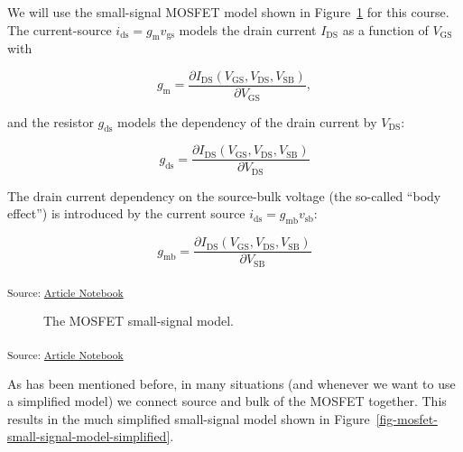 \documentclass[
  a4paper,
  DIV=11,
  numbers=noendperiod]{scrartcl}
\begin{document}
We will use the small-signal MOSFET model shown in
Figure~\ref{fig-mosfet-small-signal-model} for this course. The
current-source \(i_\mathrm{ds}= g_\mathrm{m}v_\mathrm{gs}\) models the
drain current \(I_\mathrm{DS}\) as a function of \(V_\mathrm{GS}\) with

\[
g_\mathrm{m}= \frac{\partial I_\mathrm{DS}(V_\mathrm{GS}, V_\mathrm{DS}, V_\mathrm{SB})}{\partial V_\mathrm{GS}},
\]

and the resistor \(g_\mathrm{ds}\) models the dependency of the drain
current by \(V_\mathrm{DS}\):

\[
g_\mathrm{ds}= \frac{\partial I_\mathrm{DS}(V_\mathrm{GS}, V_\mathrm{DS}, V_\mathrm{SB})}{\partial V_\mathrm{DS}}
\]

The drain current dependency on the source-bulk voltage (the so-called
``body effect'') is introduced by the current source
\(i_\mathrm{ds}= g_\mathrm{mb} v_\mathrm{sb}\):

\[
g_\mathrm{mb}= \frac{\partial I_\mathrm{DS}(V_\mathrm{GS}, V_\mathrm{DS}, V_\mathrm{SB})}{\partial V_\mathrm{SB}}
\]

\textsubscript{Source:
\href{https://iic-jku.github.io/analog-circuit-design/index.qmd.html}{Article
Notebook}}

\begin{figure}[H]


\caption{\label{fig-mosfet-small-signal-model}The MOSFET small-signal
model.}

\end{figure}%

\textsubscript{Source:
\href{https://iic-jku.github.io/analog-circuit-design/index.qmd.html}{Article
Notebook}}

As has been mentioned before, in many situations (and whenever we want
to use a simplified model) we connect source and bulk of the MOSFET
together. This results in the much simplified small-signal model shown
in Figure~\ref{fig-mosfet-small-signal-model-simplified}.
\end{document}
